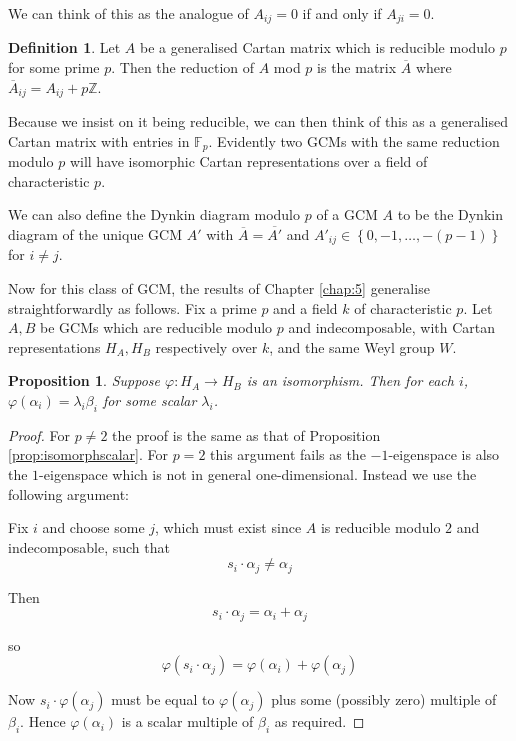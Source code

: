 \documentclass[11pt,a4paper]{report}
\newtheorem{proposition}[theorem]{Proposition}
\theoremstyle{definition}
\newtheorem{definition}[theorem]{Definition}
\begin{document}
We can think of this as the analogue of $A_{ij} = 0$ if and only if $A_{ji} = 0$. 

\begin{definition}Let $A$ be a generalised Cartan matrix which is reducible modulo $p$ for some prime $p$. Then the reduction of $A$ mod $p$ is the matrix $\overline{A}$ where $\overline{A}_{ij} = A_{ij} + p \mathbb{Z}$. \end{definition}

Because we insist on it being reducible, we can then think of this as a generalised Cartan matrix with entries in $\mathbb{F}_p$. Evidently two GCMs with the same reduction modulo $p$ will have isomorphic Cartan representations over a field of characteristic $p$.

We can also define the Dynkin diagram modulo $p$ of a GCM $A$ to be the Dynkin diagram of the unique GCM $A'$ with $\overline{A} = \overline{A'}$ and $A'_{ij} \in \left\{0, -1, \ldots,-(p-1)\right\}$ for $i \neq j$.

Now for this class of GCM, the results of Chapter \ref{chap:5} generalise straightforwardly as follows. Fix a prime $p$ and a field $k$ of characteristic $p$. Let $A, B$ be GCMs which are reducible modulo $p$ and indecomposable, with Cartan representations $H_A, H_B$ respectively over $k$, and the same Weyl group $W$.

\begin{proposition} \label{prop:isomorphscalarmodp} Suppose $\varphi: H_A \to H_B$ is an isomorphism. Then for each $i$, $\varphi(\alpha_i) = \lambda_i \beta_i$ for some scalar $\lambda_i$. \end{proposition}

\begin{proof}
    For $p \neq 2$ the proof is the same as that of Proposition \ref{prop:isomorphscalar}. For $p = 2$ this argument fails as the $-1$-eigenspace is also the $1$-eigenspace which is not in general one-dimensional. Instead we use the following argument:

    Fix $i$ and choose some $j$, which must exist since $A$ is reducible modulo $2$ and indecomposable, such that \begin{equation*}s_i \cdot \alpha_j \neq \alpha_j\end{equation*} 

    Then \begin{equation*} s_i \cdot \alpha_j = \alpha_i + \alpha_j\end{equation*}

    so \begin{equation*} \varphi(s_i \cdot \alpha_j) = \varphi(\alpha_i) + \varphi(\alpha_j)\end{equation*}

    Now $s_i \cdot \varphi(\alpha_j)$ must be equal to $\varphi(\alpha_j)$ plus some (possibly zero) multiple of $\beta_i$. Hence $\varphi(\alpha_i)$ is a scalar multiple of $\beta_i$ as required.     
\end{proof}
\end{document}
